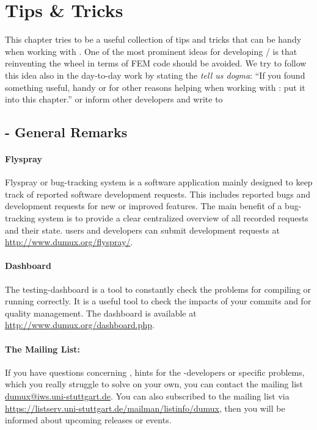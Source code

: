 \section{Tips \& Tricks}

This chapter tries to be a useful collection of tips and tricks that can be handy
when working with \Dumux. One of the most prominent ideas for developing
\Dune / \Dumux is that reinventing the wheel in terms of FEM code should
be avoided. We try to follow this idea also in the day-to-day work by
stating the \emph{tell us dogma}: ``If you found something useful,
handy or for other reasons helping when working with \Dumux: put it into
this chapter.'' or inform other developers and write to

\subsection{\Dumux - General Remarks}

\paragraph{Flyspray}
Flyspray or bug-tracking system is a software application mainly designed to
keep track of reported software development requests. This includes reported
bugs and development requests for new or improved features. The main benefit
of a bug-tracking system is to provide a clear centralized overview of all
recorded requests and their state. \Dumux users and developers can submit
development requests at \url{http://www.dumux.org/flyspray/}.

\paragraph{Dashboard}
The testing-dashboard is a tool to constantly check the \Dumux problems for compiling
or running correctly. It is a useful tool to check the impacts of your commits
and for quality management. The dashboard is available at
\url{http://www.dumux.org/dashboard.php}.

\paragraph{The \Dumux Mailing List:}
If you have questions concerning \Dumux, hints for the \Dumux-developers
or specific problems, which you really struggle to solve on your own,
you can contact the mailing list \url{dumux@iws.uni-stuttgart.de}.
You can also subscribed to the mailing list via
\url{https://listserv.uni-stuttgart.de/mailman/listinfo/dumux}, then you
will be informed about upcoming releases or events.


